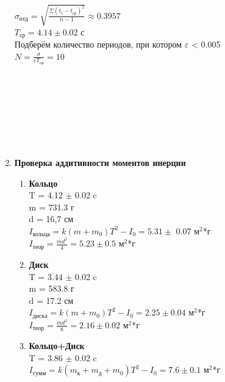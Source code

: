 \documentclass[12pt]{article}
\begin{document}
\begin{enumerate}
	       $\sigma_{отд} = \sqrt{\frac{\Sigma (t_i - t_{cp})^2 }{n-1}} \approx 0.3957$ \\
	       $T_{ср} = 4.14 \pm 0.02$ с \\
	       Подберём количество периодов, при котором $\varepsilon$ < 0.005 \\
	       $ N=\frac{ \sigma }{ \varepsilon T_{ср}} = 10 $ \\ \\ \\ \\ \\ \\
	       \\ \\
	       
	   \item \textbf{Проверка аддитивности моментов инерции} \\\newline 
		   \begin{enumerate}
		   	\item \textbf{Кольцо} \\\newline
		   	T = 4.12 $\pm$ 0.02 c \\
		   	m = 731.3 г \\
		   	d = 16,7 см \\
		   	$I_{\text{кольца}}=k(m+m_0)T^2-I_0=5.31 \pm$ 0.07 $м^2$*г \\
		   	$I_{\text{теор}}=\frac{md^2}{4} = 5.23 \pm 0.5$ $м^2$*г \\
		   	
		   	
		   	\item \textbf{Диск} \\\newline
		   	T = 3.44 $\pm$ 0.02 c \\
		   	m = 583.8 г \\
		   	d = 17.2 см \\
		   	$I_{диска}=k(m+m_0)T^2-I_0=2.25 \pm 0.04 $ $м^2$*г \\
		   	$I_{теор}=\frac{md^2}{8} = 2.16 \pm 0.02 $ $м^2$*г \\
		   	
		   	\item \textbf{Кольцо+Диск} \\\newline
		   	T = 3.86 $\pm$ 0.02 c \\
		   	$I_{сумм}=k(m_к+m_д+m_0)T^2-I_0=7.6 \pm 0.1 $ $м^2$*г \\
		   	 \\
		   	

\end{enumerate}
\end{enumerate}
\end{document}
